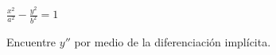 \item $\displaystyle \frac{x^2}{a^2} - \frac{y^2}{b^2} = 1$
\par
Encuentre $y''$ por medio de la diferenciación implícita.
